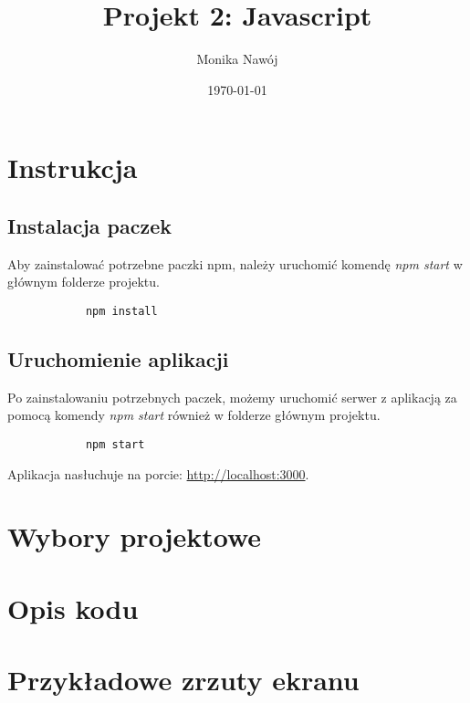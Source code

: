\documentclass[
    12pt, %
]{fphw}
\title{Projekt 2: Javascript} %
\author{Monika Nawój} %
\date{\today} %
\institute{Politechnika Warszawska \\ Wydział Elektroniki i Technik Informacyjnych} %
\begin{document}
    \maketitle %

    \section{Instrukcja}
    \subsection{Instalacja paczek}
    Aby zainstalować potrzebne paczki npm, należy uruchomić komendę \textit{npm start} w głównym folderze projektu.
        \begin{lstlisting}
            npm install
        \end{lstlisting}
    \subsection{Uruchomienie aplikacji}
    Po zainstalowaniu potrzebnych paczek, możemy uruchomić serwer z aplikacją za pomocą komendy \textit{npm start}
    również w folderze głównym projektu.
    \begin{lstlisting}
            npm start
    \end{lstlisting}
    Aplikacja nasłuchuje na porcie: \url{http://localhost:3000}.
    \section{Wybory projektowe}
    \section{Opis kodu}
    \section{Przykładowe zrzuty ekranu}

    \lstlistoflistings
    \listoffigures
    \listoftables
\end{document}
